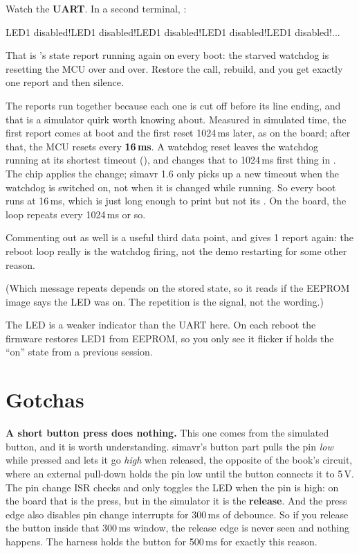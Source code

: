 Watch the \textbf{UART}. In a second terminal, :

\begin{console}
LED1 disabled!LED1 disabled!LED1 disabled!LED1 disabled!LED1 disabled!...
\end{console}

\noindent That is 's state report running again on every boot: the starved watchdog
is resetting the MCU over and over. Restore the  call, rebuild, and you get
exactly one report and then silence.

The reports run together because each one is cut off before its line ending, and that is a
simulator quirk worth knowing about. Measured in simulated time, the first report comes at boot and
the first reset 1024\,ms later, as on the board; after that, the MCU resets every
\textbf{16\,ms}. A watchdog reset leaves the watchdog running at its shortest timeout
(), and  changes that to 1024\,ms first thing in
. The chip applies the change; simavr 1.6 only picks up a new timeout when the
watchdog is switched on, not when it is changed while running. So every boot runs at 16\,ms, which
is just long enough to print  but not its \code{\r\n}. On the board, the loop
repeats every 1024\,ms or so.

Commenting out  as well is a useful third data point, and gives 1 report
again: the reboot loop really is the watchdog firing, not the demo restarting for some other
reason.

(Which message repeats depends on the stored state, so it reads  if the EEPROM
image says the LED was on. The repetition is the signal, not the wording.)

The LED is a weaker indicator than the UART here. On each reboot the firmware restores LED1 from
EEPROM, so you only see it flicker if  holds the ``on'' state from a previous
session.

\section{Gotchas}
\label{sim:sec:gotchas}
\textbf{A short button press does nothing.} This one comes from the simulated button, and it is
worth understanding. simavr's button part pulls the pin \emph{low} while pressed and lets it go
\emph{high} when released, the opposite of the book's circuit, where an external pull-down holds
the pin low until the button connects it to 5\,V. The pin change ISR checks 
and only toggles the LED when the pin is high: on the board that is the press, but in the simulator
it is the \textbf{release}. And the press edge also disables pin change interrupts for 300\,ms of
debounce. So if you release the button inside that 300\,ms window, the release edge is never seen
and nothing happens. The harness holds the button for 500\,ms for exactly this reason.

